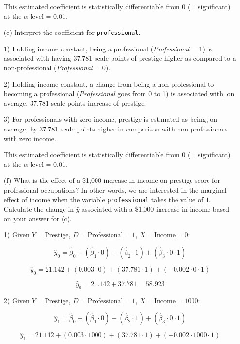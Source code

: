 \documentclass[12pt,letterpaper]{article}
\begin{document}
\begin{enumerate}
This estimated coefficient is statistically differentiable from 0 (= significant) at the \(\alpha\) level = 0.01.

	\vspace{0.5cm}	
	\item [(e)]
	Interpret the coefficient for \texttt{professional}.

1) Holding income constant, being a professional (\textit{Professional} = 1) is associated with having 37.781 scale points of prestige higher as compared to a non-professional (\textit{Professional} = 0).

2) Holding income constant, a change from being a non-professional to becoming a professional (\textit{Professional} goes from 0 to 1) is associated with, on average, 37.781 scale points increase of prestige.

3) For professionals with zero income, prestige is estimated as being, on average, by 37.781 scale points higher in comparison with non-professionals with zero income.

This estimated coefficient is statistically differentiable from 0 (= significant) at the \(\alpha\) level = 0.01.

	\item [(f)]
	What is the effect of a \$1,000 increase in income on prestige score for professional occupations? In other words, we are interested in the marginal effect of income when the variable \texttt{professional} takes the value of $1$. Calculate the change in $\hat{y}$ associated with a \$1,000 increase in income based on your answer for (c).
	
1) Given \(Y = \text{Prestige}\), \(D = \text{Professional} = 1\), \(X = \text{Income} = 0\):

\[ \hat{\textit{y}}_0 = \hat{\beta}_0 + (\hat{\beta}_1 \cdot 0) + (\hat{\beta}_2 \cdot 1) + (\hat{\beta}_3 \cdot 0 \cdot 1)  \] 

\[ \hat{\textit{y}}_0 = 21.142  + (0.003 \cdot 0) + (37.781 \cdot 1) + (-0.002 \cdot 0 \cdot 1)  \] 

\[ \hat{\textit{y}}_0 = 21.142 + 37.781 = 58.923 \] 

2) Given \(Y = \text{Prestige}\), \(D = \text{Professional} = 1\), \(X = \text{Income} = 1000\):

\[ \hat{\textit{y}}_1 = \hat{\beta}_0 + (\hat{\beta}_1 \cdot 0) + (\hat{\beta}_2 \cdot 1) + (\hat{\beta}_3 \cdot 0 \cdot 1)  \] 

\[ \hat{\textit{y}}_1 = 21.142  + (0.003 \cdot 1000) + (37.781 \cdot 1) + (-0.002 \cdot 1000 \cdot 1)  \] 


\end{enumerate}
\end{document}
